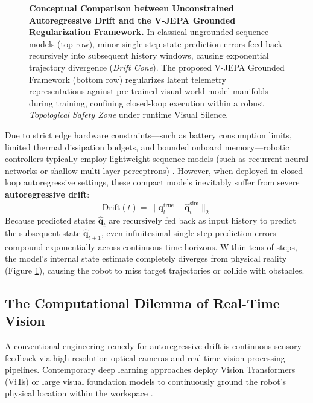 \documentclass[11pt,a4paper]{article}
\begin{document}
\begin{figure}[ht!]
{
    }
    \caption{\textbf{Conceptual Comparison between Unconstrained Autoregressive Drift and the V-JEPA Grounded Regularization Framework.} In classical ungrounded sequence models (top row), minor single-step state prediction errors feed back recursively into subsequent history windows, causing exponential trajectory divergence (\textit{Drift Cone}). The proposed V-JEPA Grounded Framework (bottom row) regularizes latent telemetry representations against pre-trained visual world model manifolds during training, confining closed-loop execution within a robust \textit{Topological Safety Zone} under runtime Visual Silence.}
    \label{fig:concept_blueprint}
\end{figure}

Due to strict edge hardware constraints—such as battery consumption limits, limited thermal dissipation budgets, and bounded onboard memory—robotic controllers typically employ lightweight sequence models (such as recurrent neural networks or shallow multi-layer perceptrons) \cite{sutton2018reinforcement, hessel2018rainbow}. However, when deployed in closed-loop autoregressive settings, these compact models inevitably suffer from severe \textbf{autoregressive drift}:
\begin{equation}
    \text{Drift}(t) = \|\mathbf{q}_t^{\text{true}} - \hat{\mathbf{q}}_t^{\text{sim}}\|_2
\end{equation}
Because predicted states $\hat{\mathbf{q}}_t$ are recursively fed back as input history to predict the subsequent state $\hat{\mathbf{q}}_{t+1}$, even infinitesimal single-step prediction errors compound exponentially across continuous time horizons. Within tens of steps, the model's internal state estimate completely diverges from physical reality (Figure \ref{fig:concept_blueprint}), causing the robot to miss target trajectories or collide with obstacles.

\subsection{The Computational Dilemma of Real-Time Vision}
A conventional engineering remedy for autoregressive drift is continuous sensory feedback via high-resolution optical cameras and real-time vision processing pipelines. Contemporary deep learning approaches deploy Vision Transformers (ViTs) or large visual foundation models to continuously ground the robot's physical location within the workspace \cite{dosovitskiy2020image, caron2021emerging}.
\end{document}
